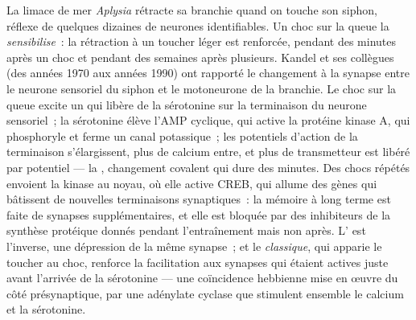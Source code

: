 \begin{proposition}\label{prop:b3:learning-memory:aplysia}
La limace de mer \emph{Aplysia} rétracte sa branchie quand on touche son
siphon, réflexe de quelques dizaines de neurones identifiables. Un choc
sur la queue la \emph{sensibilise}~: la rétraction à un toucher léger
est renforcée, pendant des minutes après un choc et pendant des semaines
après plusieurs. Kandel et ses collègues (des années 1970 aux années
1990) ont rapporté le changement à la synapse entre le neurone sensoriel
du siphon et le motoneurone de la branchie. Le choc sur la queue excite
un  qui libère de la sérotonine sur la terminaison du
neurone sensoriel~; la sérotonine élève l'AMP cyclique, qui active la
protéine kinase A, qui phosphoryle et ferme un canal potassique~; les
potentiels d'action de la terminaison s'élargissent, plus de calcium
entre, et plus de transmetteur est libéré par potentiel --- la
\emph{}, changement covalent qui dure des
minutes. Des chocs répétés envoient la kinase au noyau, où elle active
CREB, qui allume des gènes qui bâtissent de nouvelles terminaisons
synaptiques~: la mémoire à long terme est faite de synapses
supplémentaires, et elle est bloquée par des inhibiteurs de la synthèse
protéique donnés pendant l'entraînement mais non après.
L'\emph{} est l'inverse, une dépression de la même synapse~;
et le \emph{ classique}, qui apparie le toucher au choc,
renforce la facilitation aux synapses qui étaient actives juste avant
l'arrivée de la sérotonine --- une coïncidence hebbienne mise en œuvre
du côté présynaptique, par une adénylate cyclase que stimulent ensemble
le calcium et la sérotonine.
\end{proposition}

